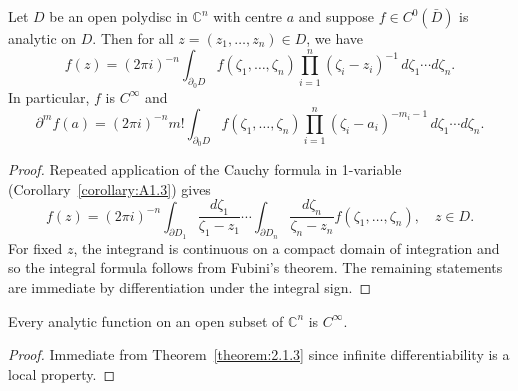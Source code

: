  Let $D$ be an open polydisc in $\mathbb C^n$ with centre $a$ and suppose $f\in C^0(\bar D)$ is analytic on $D$. Then for all $z=(z_1,\ldots,z_n)\in D$, we have
\[f(z)=(2\pi i)^{-n}\int_{\partial_0D}f(\zeta_1,\ldots,\zeta_n)\prod_{i=1}^n(\zeta_i-z_i)^{-1}\,d\zeta_1\cdots d\zeta_n.\]
In particular, $f$ is $C^\infty$ and
\[\partial^m f(a)=(2\pi i)^{-n}m!\int_{\partial_0D}f(\zeta_1,\ldots,\zeta_n)\prod_{i=1}^n(\zeta_i-a_i)^{-m_i-1}\,d\zeta_1\cdots d\zeta_n.\]
\begin{proof}
Repeated application of the Cauchy formula in 1-variable (Corollary~\ref{corollary:A1.3}) gives
\[f(z)=(2\pi i)^{-n}\int_{\partial D_1}\frac{d\zeta_1}{\zeta_1-z_1}\cdots\int_{\partial D_n}\frac{d\zeta_n}{\zeta_n-z_n}f(\zeta_1,\ldots,\zeta_n),\quad z\in D.\]
For fixed $z$, the integrand is continuous on a compact domain of integration and so the integral formula follows from Fubini's theorem. The remaining statements are immediate by differentiation under the integral sign.
\end{proof}
 Every analytic function on an open subset of $\mathbb C^n$ is $C^\infty$.
\begin{proof}
Immediate from Theorem~\ref{theorem:2.1.3} since infinite differentiability is a local property.
\end{proof}
